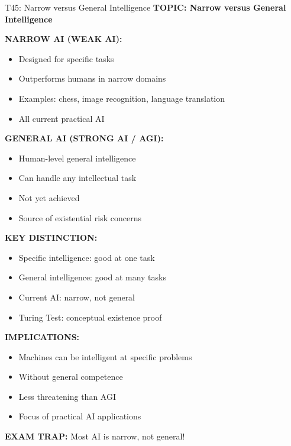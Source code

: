 \documentclass[8pt]{beamer}
\begin{document}
	\begin{frame}{T45: Narrow versus General Intelligence}
		\fontsize{6.5}{7.5}\selectfont
		\textbf{TOPIC: Narrow versus General Intelligence}
		
		\vspace{0.1cm}
		\textbf{NARROW AI (WEAK AI):}
		\begin{itemize}
			\item Designed for specific tasks
			\item Outperforms humans in narrow domains
			\item Examples: chess, image recognition, language translation
			\item All current practical AI
		\end{itemize}
		
		\vspace{0.1cm}
		\textbf{GENERAL AI (STRONG AI / AGI):}
		\begin{itemize}
			\item Human-level general intelligence
			\item Can handle any intellectual task
			\item Not yet achieved
			\item Source of existential risk concerns
		\end{itemize}
		
		\vspace{0.1cm}
		\textbf{KEY DISTINCTION:}
		\begin{itemize}
			\item Specific intelligence: good at one task
			\item General intelligence: good at many tasks
			\item Current AI: narrow, not general
			\item Turing Test: conceptual existence proof
		\end{itemize}
		
		\vspace{0.1cm}
		\textbf{IMPLICATIONS:}
		\begin{itemize}
			\item Machines can be intelligent at specific problems
			\item Without general competence
			\item Less threatening than AGI
			\item Focus of practical AI applications
		\end{itemize}
		
		\textcolor{myred}{\textbf{EXAM TRAP:}} Most AI is \textcolor{myblue}{narrow}, not general!
	\end{frame}
	
\end{document}
